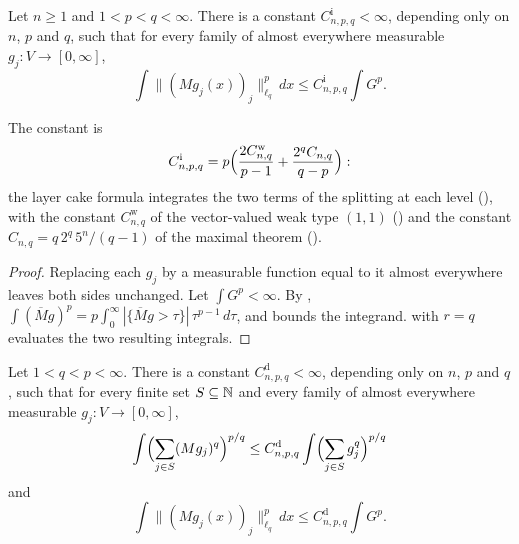 \begin{theorem}
\label{thm:fefferman-stein-interpolation}
\leanok
{}
Let $n \geq 1$ and $1 < p < q < \infty$. There is a constant $C^{\mathrm i}_{n,p,q} < \infty$,
depending only on $n$, $p$ and $q$, such that for every family of almost everywhere measurable
$g_j : V \to [0, \infty]$,
\[
  \int \|(M g_j(x))_j\|_{\ell_q}^p \, dx \leq C^{\mathrm i}_{n,p,q} \int G^p .
\]
\end{theorem}

The constant is
\[
  C^{\mathrm i}_{n,p,q} = p \Bigl( \frac{2 C^{\mathrm w}_{n,q}}{p - 1}
    + \frac{2^q C_{n,q}}{q - p} \Bigr) :
\]
the layer cake formula integrates the two terms of the splitting at each level
(), with the constant $C^{\mathrm w}_{n,q}$ of the vector-valued
weak type $(1,1)$ () and the constant
$C_{n,q} = q \, 2^q \, 5^n / (q - 1)$ of the maximal theorem ().

\begin{proof}
\leanok
Replacing each $g_j$ by a measurable function equal to it almost everywhere leaves both sides
unchanged. Let $\int G^p < \infty$. By ,
$\int (\overline M g)^p = p \int_0^\infty |\{\overline M g > \tau\}| \, \tau^{p-1} \, d\tau$, and
 bounds the integrand.  with
$r = q$ evaluates the two resulting integrals.
\end{proof}

\begin{theorem}
\label{thm:fefferman-stein-duality}
\leanok
{}
Let $1 < q < p < \infty$. There is a constant $C^{\mathrm d}_{n,p,q} < \infty$, depending only
on $n$, $p$ and $q$, such that for every finite set $S \subseteq \mathbb{N}$ and every family of almost
everywhere measurable $g_j : V \to [0, \infty]$,
\[
  \int \Bigl( \sum_{j \in S} (M g_j)^q \Bigr)^{p/q}
  \leq C^{\mathrm d}_{n,p,q} \int \Bigl( \sum_{j \in S} g_j^q \Bigr)^{p/q}
\]
and
\[
  \int \|(M g_j(x))_j\|_{\ell_q}^p \, dx \leq C^{\mathrm d}_{n,p,q} \int G^p .
\]
\end{theorem}

